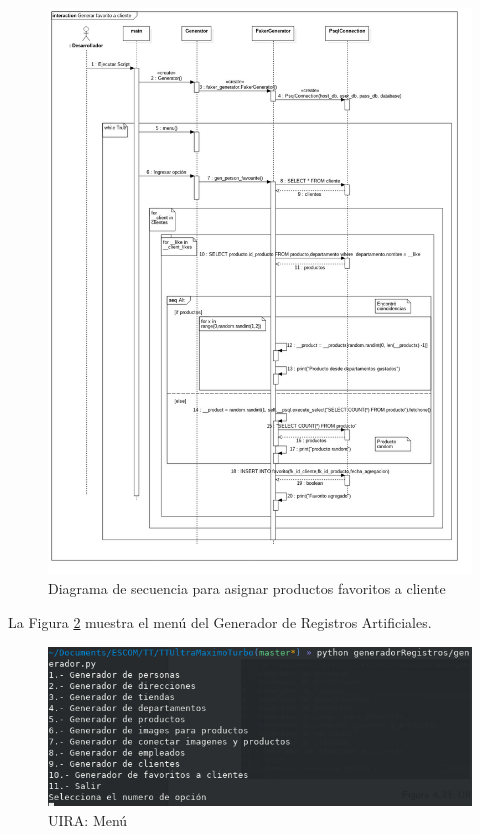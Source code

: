 \FloatBarrier
\begin{figure}[htbp!]
		\centering
			\includegraphics[width=1 \textwidth]{imagenes/DSRuben/gen_person_favourite_generator}
		\caption{Diagrama de secuencia para asignar productos favoritos a cliente}
		\label{image:DSAsignarFavoritosAClientes}
\end{figure}
\FloatBarrier

La Figura \ref{RA:1} muestra el menú del Generador de Registros Artificiales.

\FloatBarrier
\begin{figure}[htbp!]
		\centering
			\includegraphics[width=.9 \textwidth]{imagenes/registrosArt/Menu}
		\caption{UIRA: Menú}
		\label{RA:1}
\end{figure}
\FloatBarrier




